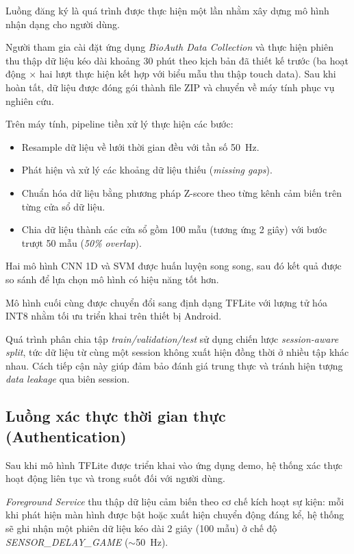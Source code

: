 \documentclass[../DoAn.tex]{subfiles}
\begin{document}
    Luồng đăng ký là quá trình được thực hiện một lần nhằm xây dựng mô hình nhận dạng cho người dùng.
    
    Người tham gia cài đặt ứng dụng \textit{BioAuth Data Collection} và thực hiện phiên thu thập dữ liệu kéo dài khoảng 30 phút theo kịch bản đã thiết kế trước (ba hoạt động $\times$ hai lượt thực hiện kết hợp với biểu mẫu thu thập touch data). Sau khi hoàn tất, dữ liệu được đóng gói thành file ZIP và chuyển về máy tính phục vụ nghiên cứu.
    
    Trên máy tính, pipeline tiền xử lý thực hiện các bước:
    \begin{itemize}
        \item Resample dữ liệu về lưới thời gian đều với tần số 50~Hz.
        
        \item Phát hiện và xử lý các khoảng dữ liệu thiếu (\textit{missing gaps}).
        
        \item Chuẩn hóa dữ liệu bằng phương pháp Z-score theo từng kênh cảm biến trên từng cửa sổ dữ liệu.
        
        \item Chia dữ liệu thành các cửa sổ gồm 100 mẫu (tương ứng 2 giây) với bước trượt 50 mẫu (\textit{50\% overlap}).
    \end{itemize}
    
    Hai mô hình CNN 1D và SVM được huấn luyện song song, sau đó kết quả được so sánh để lựa chọn mô hình có hiệu năng tốt hơn.
    
    Mô hình cuối cùng được chuyển đổi sang định dạng TFLite với lượng tử hóa INT8 nhằm tối ưu triển khai trên thiết bị Android.
    
    Quá trình phân chia tập \textit{train/validation/test} sử dụng chiến lược \textit{session-aware split}, tức dữ liệu từ cùng một session không xuất hiện đồng thời ở nhiều tập khác nhau. Cách tiếp cận này giúp đảm bảo đánh giá trung thực và tránh hiện tượng \textit{data leakage} qua biên session.
    
    \subsection{Luồng xác thực thời gian thực (Authentication)}
    
    Sau khi mô hình TFLite được triển khai vào ứng dụng demo, hệ thống xác thực hoạt động liên tục và trong suốt đối với người dùng.
    
    \textit{Foreground Service} thu thập dữ liệu cảm biến theo cơ chế kích hoạt sự kiện: mỗi khi phát hiện màn hình được bật hoặc xuất hiện chuyển động đáng kể, hệ thống sẽ ghi nhận một phiên dữ liệu kéo dài 2 giây (100 mẫu) ở chế độ \textit{SENSOR\_DELAY\_GAME} ($\sim$50~Hz).
    
\end{document}
